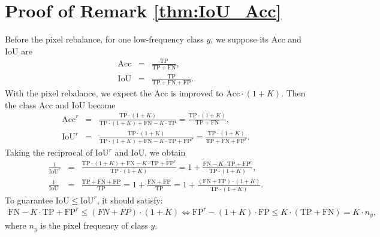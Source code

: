 \documentclass[final]{cvpr}
\begin{document}
\vspace{0.5in}
\section{Proof of Remark \ref{thm:IoU_Acc}}
\noindent Before the pixel rebalance, for one low-frequency class $y$, we suppose its $\mathrm{Acc}$ and $\mathrm{IoU}$ are
\begin{eqnarray}
\mathrm{Acc} &=& \frac{\mathrm{TP}}{\mathrm{TP}+\mathrm{FN}},  \\
\mathrm{IoU} &=& \frac{\mathrm{TP}}{\mathrm{TP}+\mathrm{FN}+\mathrm{FP}}. 
\end{eqnarray}
With the pixel rebalance, we expect the $\mathrm{Acc}$ is improved to $\mathrm{Acc} \cdot (1+K)$. Then the class $\mathrm{Acc}$ and $\mathrm{IoU}$ become
\begin{eqnarray}
\mathrm{Acc}^{r} &=& \frac{\mathrm{TP} \cdot (1+K)}{\mathrm{TP} \cdot (1+K) + \mathrm{FN} - K \cdot \mathrm{TP}} = \frac{\mathrm{TP} \cdot (1+K)}{\mathrm{TP}+\mathrm{FN}},  \\
\mathrm{IoU}^{r} &=& \frac{\mathrm{TP} \cdot (1+K)}{\mathrm{TP} \cdot (1+K) + \mathrm{FN} - K \cdot \mathrm{TP} +\mathrm{FP}^{r}} = \frac{\mathrm{TP} \cdot (1+K)}{\mathrm{TP}+\mathrm{FN} + \mathrm{FP}^{r}}. 
\end{eqnarray}
Taking the reciprocal of $\mathrm{IoU}^{r}$ and $\mathrm{IoU}$, we obtain
\begin{eqnarray}
\frac{1}{\mathrm{IoU}^{r}} &=& \frac{\mathrm{TP} \cdot (1+K) + \mathrm{FN} - K \cdot \mathrm{TP} +\mathrm{FP}^{r}}{\mathrm{TP} \cdot (1+K)} = 1 + \frac{\mathrm{FN} - K \cdot \mathrm{TP} + \mathrm{FP}^{r}}{\mathrm{TP} \cdot (1+K)}, \\
\frac{1}{\mathrm{IoU}}     &=& \frac{\mathrm{TP} + \mathrm{FN} + \mathrm{FP}}{\mathrm{TP}}=1 + \frac{\mathrm{FN} + \mathrm{FP}}{\mathrm{TP}} = 1 + \frac{(\mathrm{FN} + \mathrm{FP}) \cdot (1+K)}{\mathrm{TP} \cdot (1+K)}.
\end{eqnarray}
To guarantee $\mathrm{IoU} \leq \mathrm{IoU}^{r}$, it should satisfy:
\begin{eqnarray}
\mathrm{FN} - K \cdot \mathrm{TP} + \mathrm{FP}^{r} \leq (FN+FP) \cdot (1+K) \iff \mathrm{FP}^{r} - (1+K) \cdot \mathrm{FP} \leq K \cdot (\mathrm{TP} + \mathrm{FN})=K \cdot n_{y},
\end{eqnarray}
where $n_{y}$ is the pixel frequency of class $y$.
\end{document}
